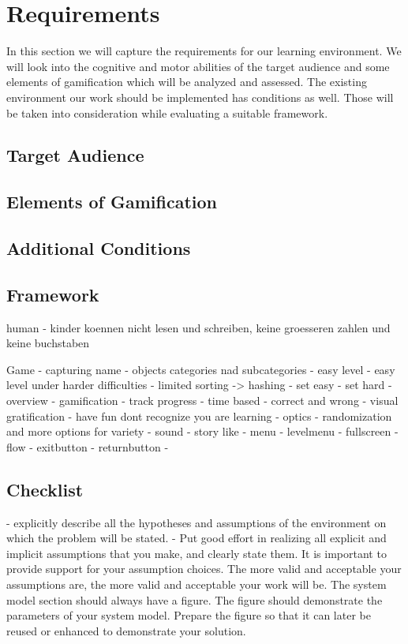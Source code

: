 
\chapter{Requirements}
\label{chap:requirements}

In this section we will capture the requirements for our learning environment.
We will look into the cognitive and motor abilities of the target audience and
some elements of gamification which will be analyzed and assessed.
The existing environment our work should be implemented has conditions as well.
Those will be taken into consideration while evaluating a suitable framework.

\section*{Target Audience}
\section*{Elements of Gamification}
\section*{Additional Conditions}
\section*{Framework}

human
- kinder koennen nicht lesen und schreiben, keine groesseren zahlen und keine buchstaben

Game
- capturing name
- objects categories nad subcategories
- easy level
- easy level under harder difficulties
- limited sorting -> hashing
- set easy
- set hard
- overview
- gamification
    - track progress
        - time based
        - correct and wrong
        - visual gratification
    - have fun dont recognize you are learning
        - optics
            - randomization and more options for variety
        - sound
        - story like
    - menu
    - levelmenu
    - fullscreen
    - flow
        - exitbutton
        - returnbutton
    -


\section{Checklist}
- explicitly describe all the hypotheses and assumptions of the environment on which the problem will be stated.
- Put good effort in realizing all explicit and implicit assumptions that you make, and clearly state them.
It is important to provide support for
your assumption choices. The more valid and acceptable
your assumptions are, the more valid and acceptable your
work will be.
The system model section should always have a figure.
The figure should demonstrate the parameters of your
system model. Prepare the figure so that it can later be
reused or enhanced to demonstrate your solution.


